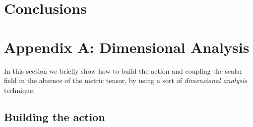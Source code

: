 \documentclass[10pt,a4paper]{article}
\begin{document}
\section{Conclusions}


\section{Appendix A: Dimensional Analysis}

In this section we briefly show how to build the action and coupling the scalar field in the absence of the metric tensor, by using a sort of
\textit{dimensional analysis} technique.

\subsection{Building the action}
\end{document}

